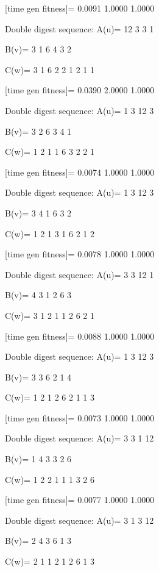 [time gen fitness]=
    0.0091    1.0000    1.0000

Double digest sequence:
A(u)=
    12     3     3     1

B(v)=
     3     1     6     4     3     2

C(w)=
     3     1     6     2     2     1     2     1     1

[time gen fitness]=
    0.0390    2.0000    1.0000

Double digest sequence:
A(u)=
     1     3    12     3

B(v)=
     3     2     6     3     4     1

C(w)=
     1     2     1     1     6     3     2     2     1

[time gen fitness]=
    0.0074    1.0000    1.0000

Double digest sequence:
A(u)=
     1     3    12     3

B(v)=
     3     4     1     6     3     2

C(w)=
     1     2     1     3     1     6     2     1     2

[time gen fitness]=
    0.0078    1.0000    1.0000

Double digest sequence:
A(u)=
     3     3    12     1

B(v)=
     4     3     1     2     6     3

C(w)=
     3     1     2     1     1     2     6     2     1

[time gen fitness]=
    0.0088    1.0000    1.0000

Double digest sequence:
A(u)=
     1     3    12     3

B(v)=
     3     3     6     2     1     4

C(w)=
     1     2     1     2     6     2     1     1     3

[time gen fitness]=
    0.0073    1.0000    1.0000

Double digest sequence:
A(u)=
     3     3     1    12

B(v)=
     1     4     3     3     2     6

C(w)=
     1     2     2     1     1     1     3     2     6

[time gen fitness]=
    0.0077    1.0000    1.0000

Double digest sequence:
A(u)=
     3     1     3    12

B(v)=
     2     4     3     6     1     3

C(w)=
     2     1     1     2     1     2     6     1     3

